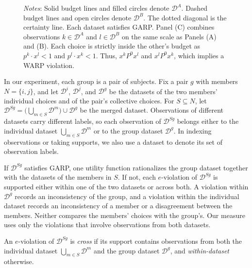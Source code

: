 \documentclass[11 pt]{article}
\begin{document}
\begin{figure}[ht]
\begin{minipage}{\textwidth}
\vspace{6pt}
{\footnotesize \emph{Notes}: Solid budget lines and filled circles denote $\mathcal D^A$. Dashed budget lines and open circles denote $\mathcal D^B$. The dotted diagonal is the certainty line. Each dataset satisfies GARP. Panel (C) combines observations $k \in \mathcal D^A$ and $l \in \mathcal D^B$ on the same scale as Panels (A) and (B). Each choice is strictly inside the other's budget as $p^k \cdot x^l < 1$ and $p^l \cdot x^k < 1$. Thus, $x^k \mathrel{P^0} x^l$ and $x^l \mathrel{P^0} x^k$, which implies a WARP violation.}
\end{minipage}
\end{figure}

In our experiment, each group is a pair of subjects. Fix a pair $g$ with members $N = \{i,j\}$, and let $\mathcal{D}^{i}$, $\mathcal{D}^{j}$, and $\mathcal{D}^{g}$ be the datasets of the two members' individual choices and of the pair's collective choices. For $S \subseteq N$, let $\mathcal{D}^{Sg} = \bigl( \bigcup_{m \in S} \mathcal{D}^{m} \bigr) \cup \mathcal{D}^{g}$ be the merged dataset. Observations of different datasets carry different labels, so each observation of $\mathcal{D}^{Sg}$ belongs either to the individual dataset $\bigcup_{m \in S} \mathcal{D}^{m}$ or to the group dataset $\mathcal{D}^{g}$. In indexing observations or taking supports, we also use a dataset to denote its set of observation labels.

If $\mathcal{D}^{Sg}$ satisfies GARP, one utility function rationalizes the group dataset together with the datasets of the members in $S$. If not, each $e$-violation of $\mathcal{D}^{Sg}$ is supported either within one of the two datasets or across both. A violation within $\mathcal{D}^{g}$ records an inconsistency of the group, and a violation within the individual dataset records an inconsistency of a member or a disagreement between the members. Neither compares the members' choices with the group's. Our measure uses only the violations that involve observations from both datasets.

\begin{definition}\label{def:cross}\normalfont
An $e$-violation of $\mathcal{D}^{Sg}$ is \emph{cross} if its support contains observations from both the individual dataset $\bigcup_{m \in S} \mathcal{D}^{m}$ and the group dataset $\mathcal{D}^{g}$, and \emph{within-dataset} otherwise.
\end{definition}
\end{document}
